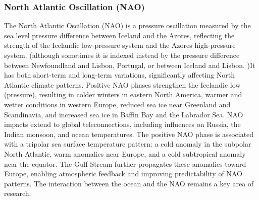 \subsubsection{North Atlantic Oscillation (NAO)}
The North Atlantic Oscillation (NAO) is a pressure oscillation measured by the sea level pressure difference between Iceland and the Azores, reflecting the strength of the Icelandic low-pressure system and the Azores high-pressure system. (although sometimes it is indexed instead by the pressure difference between Newfoundland and Lisbon, Portugal, or between Iceland and Lisbon. )It has both short-term and long-term variations, significantly affecting North Atlantic climate patterns. Positive NAO phases strengthen the Icelandic low (pressure), resulting in colder winters in eastern North America, warmer and wetter conditions in western Europe, reduced sea ice near Greenland and Scandinavia, and increased sea ice in Baffin Bay and the Labrador Sea.
NAO impacts extend to global teleconnections, including influences on Russia, the Indian monsoon, and ocean temperatures. The positive NAO phase is associated with a tripolar sea surface temperature pattern: a cold anomaly in the subpolar North Atlantic, warm anomalies near Europe, and a cold subtropical anomaly near the equator. The Gulf Stream further propagates these anomalies toward Europe, enabling atmospheric feedback and improving predictability of NAO patterns. The interaction between the ocean and the NAO remains a key area of research.

